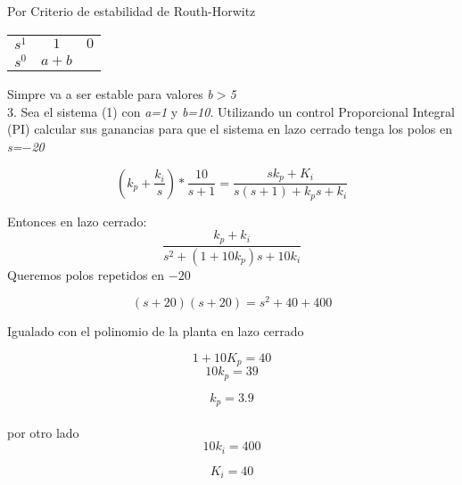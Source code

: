\documentclass{tufte-book}
\numberwithin{equation}{chapter}
\begin{document}
\begin{center}Por Criterio de estabilidad de Routh-Horwitz\end{center}

		\begin{table}[htbp]
	\centering
	\begin{tabular}{c|c c}
	$s^1$ & $1$ & $0$\\
	$s^0$ & $a+b$ &  \\
	\end{tabular}
	\end{table} 
Simpre va a ser estable para valores \emph{b$>$5} \\


3. Sea el sistema (1) con \emph{a=1} y \emph{b=10}. Utilizando un control Proporcional Integral (PI) calcular sus ganancias para que el sistema en lazo cerrado tenga los polos en \emph{s=$-$20} 

	\begin{equation}
	 	(k_p  + \frac{k_i}{s}) * \frac{10}{s+1}= \frac{s k_p + K_i}{s(s+1)+k_p s + k_i} \nonumber
	\end{equation}

 Entonces en lazo cerrado:
 \begin{equation}
    \frac{ k_p + k_i }{ s^2 + ( 1 + 10 k_p )s + 10 k_i } \nonumber	
\end{equation} 
Queremos polos repetidos en $-20$

		\begin{equation}
			(s + 20)(s + 20)= s^2 + 40 + 400 \nonumber
		\end{equation}

		Igualado con el polinomio de la planta en lazo cerrado

\begin{equation}
 			1 + 10 K_p = 40 \nonumber
\end{equation}
		\begin{equation}
			10 k_p = 39 \nonumber
		\end{equation}
				
		\begin{equation}
			k_p = 3.9 \nonumber
\end{equation}
 \\ por otro lado
\begin{equation}
	10 k_i = 400 \nonumber
\end{equation} 

\begin{equation}
		K_i = 40 \nonumber
\end{equation}




\end{document}
